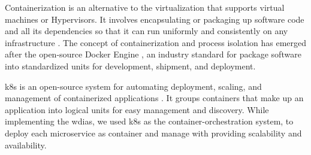 



Containerization is an alternative to the virtualization that supports virtual machines or Hypervisors. It involves encapsulating or packaging up software code and all its dependencies so that it can run uniformly and consistently on any infrastructure \cite{IBMContainerizationExplained}. The concept of containerization and process isolation has emerged after the open-source Docker Engine \cite{DockerAppContainerization}, an industry standard for package software into standardized units for development, shipment, and deployment.

\acrfull{k8s} is an open-source system for automating deployment, scaling, and management of containerized applications \cite{LinuxFoundationProduction-GradeKubernetes}. It groups containers that make up an application into logical units for easy management and discovery. While implementing the \acrshort{wdias}, we used \acrshort{k8s} as the container-orchestration system, to deploy each microservice as container and manage with providing scalability and availability.

